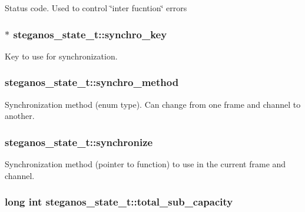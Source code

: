 \label{structsteganos__state__t_a5065391aa062854d0b9ce9eefe3a9509}
Status code. Used to control \char`\"{}inter fucntion\char`\"{} errors \hypertarget{structsteganos__state__t_a0c48742bec665d03c8f6b19b6adf69c2}{
\subsubsection[{synchro\_\-key}]{$\ast$ {\bf steganos\_\-state\_\-t::synchro\_\-key}}}
\label{structsteganos__state__t_a0c48742bec665d03c8f6b19b6adf69c2}
Key to use for synchronization. \hypertarget{structsteganos__state__t_ad4393617819cf79697d9b126ad6142ba}{
\subsubsection[{synchro\_\-method}]{ {\bf steganos\_\-state\_\-t::synchro\_\-method}}}
\label{structsteganos__state__t_ad4393617819cf79697d9b126ad6142ba}
Synchronization method (enum type). Can change from one frame and channel to another. \hypertarget{structsteganos__state__t_ab83b4da83ea658612368de71cf25ab3b}{
\subsubsection[{synchronize}]{ {\bf steganos\_\-state\_\-t::synchronize}}}
\label{structsteganos__state__t_ab83b4da83ea658612368de71cf25ab3b}
Synchronization method (pointer to function) to use in the current frame and channel. \hypertarget{structsteganos__state__t_ae8215dc4cb883543dd4bd7a47a475d74}{
\subsubsection[{total\_\-sub\_\-capacity}]{\setlength{\rightskip}{0pt plus 5cm}long int {\bf steganos\_\-state\_\-t::total\_\-sub\_\-capacity}}}
